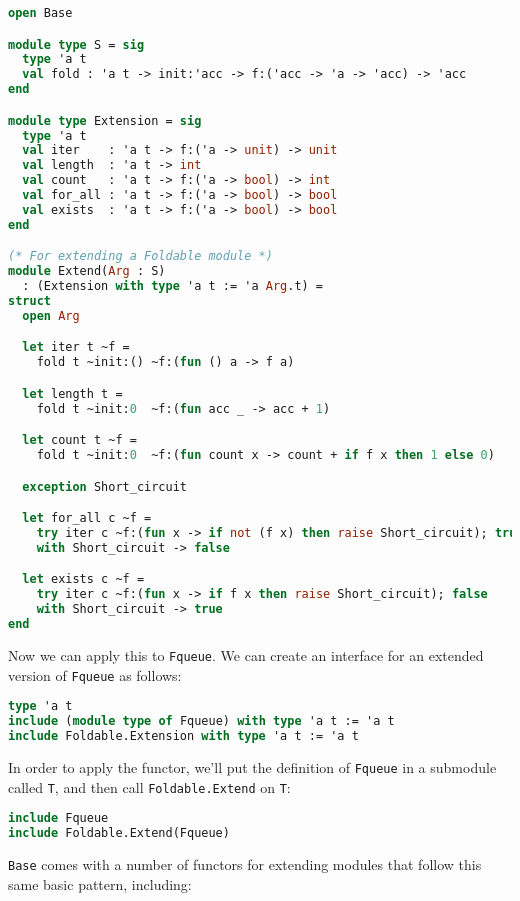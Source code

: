 \begin{lstlisting}[language=Caml]
open Base

module type S = sig
  type 'a t
  val fold : 'a t -> init:'acc -> f:('acc -> 'a -> 'acc) -> 'acc
end

module type Extension = sig
  type 'a t
  val iter    : 'a t -> f:('a -> unit) -> unit
  val length  : 'a t -> int
  val count   : 'a t -> f:('a -> bool) -> int
  val for_all : 'a t -> f:('a -> bool) -> bool
  val exists  : 'a t -> f:('a -> bool) -> bool
end

(* For extending a Foldable module *)
module Extend(Arg : S)
  : (Extension with type 'a t := 'a Arg.t) =
struct
  open Arg

  let iter t ~f =
    fold t ~init:() ~f:(fun () a -> f a)

  let length t =
    fold t ~init:0  ~f:(fun acc _ -> acc + 1)

  let count t ~f =
    fold t ~init:0  ~f:(fun count x -> count + if f x then 1 else 0)

  exception Short_circuit

  let for_all c ~f =
    try iter c ~f:(fun x -> if not (f x) then raise Short_circuit); true
    with Short_circuit -> false

  let exists c ~f =
    try iter c ~f:(fun x -> if f x then raise Short_circuit); false
    with Short_circuit -> true
end
\end{lstlisting}

Now we can apply this to \passthrough{\lstinline!Fqueue!}. We can create
an interface for an extended version of \passthrough{\lstinline!Fqueue!}
as follows:

\begin{lstlisting}[language=Caml]
type 'a t
include (module type of Fqueue) with type 'a t := 'a t
include Foldable.Extension with type 'a t := 'a t
\end{lstlisting}

In order to apply the functor, we'll put the definition of
\passthrough{\lstinline!Fqueue!} in a submodule called
\passthrough{\lstinline!T!}, and then call
\passthrough{\lstinline!Foldable.Extend!} on
\passthrough{\lstinline!T!}:

\begin{lstlisting}[language=Caml]
include Fqueue
include Foldable.Extend(Fqueue)
\end{lstlisting}

\passthrough{\lstinline!Base!} comes with a number of functors for
extending modules that follow this same basic pattern, including:

